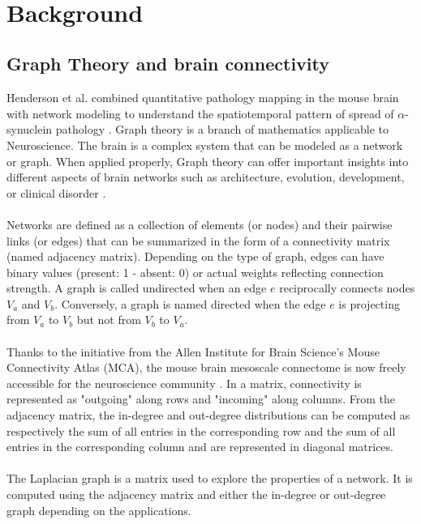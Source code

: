 \\

\section{Background}
\subsection{Graph Theory and brain connectivity}
Henderson et al. combined quantitative pathology mapping in the mouse brain with network modeling to understand the spatiotemporal pattern of spread of  $\alpha$-synuclein pathology \cite{Henderson_2019}. Graph theory is a branch of mathematics applicable to Neuroscience. The brain is a complex system that can be modeled as a network or graph. When applied properly, Graph theory can offer important insights into different aspects of brain networks such as architecture, evolution, development, or clinical disorder \cite{Sporns_2018}.\\
\\
Networks are defined as a collection of elements (or nodes) and their pairwise links (or edges) that can be summarized in the form of a connectivity matrix (named adjacency matrix). Depending on the type of graph, edges can have binary values (present: 1 - absent: 0) or actual weights reflecting connection strength. A graph is called undirected when an edge $e$ reciprocally connects nodes $V_{a}$ and $V_{b}$. Conversely, a graph is named directed when the edge $e$ is projecting from $V_{a}$ to $V_{b}$ but not from $V_{b}$ to $V_{a}$.\\
\\
Thanks to the initiative from the Allen Institute for Brain Science's Mouse Connectivity Atlas (MCA), the mouse brain mesoscale connectome is now freely accessible for the neuroscience community \cite{Oh_2014}. In a matrix, connectivity is represented as "outgoing" along  rows and "incoming" along  columns. From the adjacency matrix, the in-degree and out-degree distributions can be computed as respectively the sum of all entries in the corresponding row and the sum of all entries in the corresponding column and are represented in diagonal matrices.\\
\\
The Laplacian graph is a matrix used to explore the properties of a network. It is computed using the adjacency matrix and either the in-degree or out-degree graph depending on the applications.

